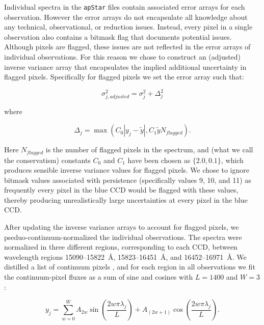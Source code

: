 \documentclass[12pt,preprint]{aastex}
\begin{document}
Individual spectra in the \texttt{apStar} files contain associated error arrays
for each observation.  However the error arrays do not encapsulate all knowledge
about any technical, observational, or reduction issues.  Instead, every pixel
in a single observation also contains a bitmask flag that documents potential
issues.  Although pixels are flagged, these issues are not reflected in the
error arrays of individual observations.  For this reason we chose to construct
an (adjusted) inverse variance array that encapsulates the implied additional 
uncertainty in flagged pixels.  Specifically for flagged pixels we set the error
array such that:


\begin{equation}
\sigma_{j,adjusted}^2 = \sigma_{j}^2 + \Delta_{j}^2
\end{equation}

\noindent{}where

\begin{equation}
\Delta_{j} = \max{\left(C_{0}|y_{j} - \widetilde{y}|,C_{1}\widetilde{y}N_{flagged}\right)} .
\end{equation}

Here $N_{flagged}$ is the number of flagged pixels in the spectrum, and (what
we call the conservatism) constants $C_0$ and $C_1$ have been chosen as 
$\{2.0,0.1\}$, which produces sensible inverse variance values for flagged
pixels.  We chose to ignore bitmask values associated with persistence 
(specifically values 9, 10, and 11) as frequently every pixel in the blue CCD
would be flagged with these values, thereby producing unrealistically large 
uncertainties at every pixel in the blue CCD.


After updating the inverse variance arrays to account for flagged pixels, we
pseduo-continuum-normalized the individual observations. The spectra were 
normalized in three different regions, corresponding to each CCD, between
wavelength regions 15090--15822~\AA, 15823--16451~\AA, and 16452--16971~\AA.
We distilled a list of continuum pixels \citep[following the initial 
identification in][]{tc}, and for each region in all observations we fit
the continuum-pixel fluxes as a sum of sine and cosines with $L = 1400$ and 
$W = 3$:

\begin{equation}
y_j = \sum_{w=0}^{W} A_{2w}\sin{\left(\frac{2w\pi\lambda_{j}}{L}\right)} + A_{(2w+1)}\cos{\left(\frac{2w\pi\lambda_{j}}{L}\right)}.
\end{equation}
\end{document}
